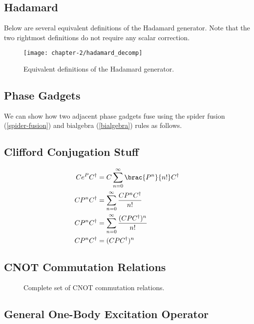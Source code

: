 \subsection{Hadamard}%
\label{appendix-hadamard}

Below are several equivalent definitions of the Hadamard generator. Note that the two rightmost definitions do not require any scalar correction.

\begin{figure}[H]
\centering
    \centering
    \texttt{[image: chapter-2/hadamard\_decomp]}
    \caption{Equivalent definitions of the Hadamard generator.}
\end{figure}


\subsection{Phase Gadgets}%
\label{appendix-phase-gadget-fusion}

We can show how two adjacent phase gadgets fuse using the spider fusion (\ref{spider-fusion}) and bialgebra (\ref{bialgebra}) rules as follows.

%


\subsection{Clifford Conjugation Stuff}%
\label{conjugation}

\begin{align*}
    Ce^PC^\dagger &= C \sum_{n=0}^\infty \brac{P^n}{n!} C^\dagger \\
    CP^nC^\dagger &= \sum_{n=0}^\infty \frac{C P^n C^\dagger}{n!} \\
    CP^nC^\dagger &= \sum_{n=0}^\infty \frac{(C P C^\dagger)^n}{n!} \\
    CP^nC^\dagger &= (CPC^\dagger)^n
\end{align*}


\subsection{CNOT Commutation Relations}

\begin{figure}[H]
    \centering
    \caption{Complete set of CNOT commutation relations.}
    \label{cnot_commutations}
\end{figure}

\subsection{General One-Body Excitation Operator}%
\label{appendix-one-body-general}

